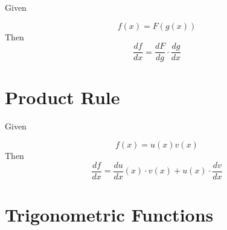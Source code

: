 \documentclass[10pt,a4paper]{report}
\begin{document}
Given

\begin{equation}
	f(x) = F(g(x))
\end{equation}
Then
\begin{equation}
	\frac{df}{dx} = \frac{dF}{dg} \cdot \frac{dg}{dx}
\end{equation}

\section{Product Rule}

Given

\begin{equation}
	f(x) = u(x)v(x)
\end{equation}
Then
\begin{equation}
	\frac{df}{dx} = \frac{du}{dx}(x)\cdot v(x) + u(x) \cdot \frac{dv}{dx}
\end{equation}

\section{Trigonometric Functions}
\end{document}
